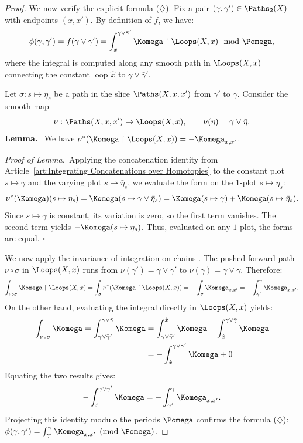 \begin{proof}
  We now verify the explicit formula ($\diamondsuit$).
  Fix a pair $(\gamma, \gamma') \in \Paths_2(X)$ with endpoints $(x,x')$.
  By definition of $f$,
  we have:
  \[
    \phi(\gamma,\gamma') = f(\gamma \vee \bar\gamma') = \int_{\hat{x}}^{\gamma \vee \bar\gamma'} \Komega \restriction \Loops(X,x) \mod \Pomega,
    \]
  where the integral is computed along any smooth path in $\Loops(X,x)$ connecting the constant loop $\hat{x}$ to $\gamma \vee \bar\gamma'$.
  
  Let $\sigma : s \mapsto \eta_s$ be a path in the slice $\Paths(X,x,x')$ from $\gamma'$ to $\gamma$.
  Consider the smooth map
  \[
    \nu : \Paths(X,x,x') \to \Loops(X,x),
    \qquad
    \nu(\eta) = \gamma \vee \bar\eta.
    \]
  \textbf{Lemma.}~ We have $\nu^*(\Komega \restriction \Loops(X,x)) = - \Komega_{x,x'}$.
  
  \textit{Proof of Lemma.}~Applying the concatenation identity from Article~\ref{art:Integrating Concatenations over Homotopies} to the constant plot $s \mapsto \gamma$ and the varying plot $s \mapsto \bar\eta_s$,
  we evaluate the form on the $1$-plot $s \mapsto \eta_s$:
  \[
    \nu^*(\Komega)(s \mapsto \eta_s) = \Komega(s \mapsto \gamma \vee \bar\eta_s) = \Komega(s \mapsto \gamma) + \Komega(s \mapsto \bar\eta_s).
    \]
  Since $s \mapsto \gamma$ is constant,
  its variation is zero,
  so the first term vanishes.
  The second term yields $- \Komega(s \mapsto \eta_s)$.
  Thus,
  evaluated on any $1$-plot,
  the forms are equal. \hfill$\square$
  
  We now apply the invariance of integration on chains \cite[]{PIZ13}.
  The pushed-forward path $\nu \circ \sigma$ in $\Loops(X,x)$ runs from $\nu(\gamma') = \gamma \vee \bar\gamma'$ to $\nu(\gamma) = \gamma \vee \bar\gamma$.
  Therefore:
  \[
    \int_{\nu \circ \sigma} \Komega \restriction \Loops(X,x) = \int_\sigma \nu^*(\Komega \restriction \Loops(X,x)) = - \int_\sigma \Komega_{x,x'} = - \int_{\gamma'}^\gamma \Komega_{x,x'}.
    \]
  On the other hand,
  evaluating the integral directly in $\Loops(X,x)$ yields:
  \begin{align*}
  \int_{\nu \circ \sigma} \Komega = \int_{\gamma \vee \bar\gamma'}^{\gamma \vee \bar\gamma} \Komega & = \int_{\gamma \vee \bar\gamma'}^{\hat{x}} \Komega + \int_{\hat{x}}^{\gamma \vee \bar\gamma} \Komega \\
  &  = - \int_{\hat{x}}^{\gamma \vee \bar\gamma'} \Komega + 0
\end{align*}
Equating the two results gives:
\[
  - \int_{\hat{x}}^{\gamma \vee \bar\gamma'} \Komega = - \int_{\gamma'}^\gamma \Komega_{x,x'}.
  \]
Projecting this identity modulo the periods $\Pomega$ confirms the formula ($\diamondsuit$):
$\phi(\gamma,\gamma') = \int_{\gamma'}^\gamma \Komega_{x,x'} \pmod \Pomega$.


\end{proof}
